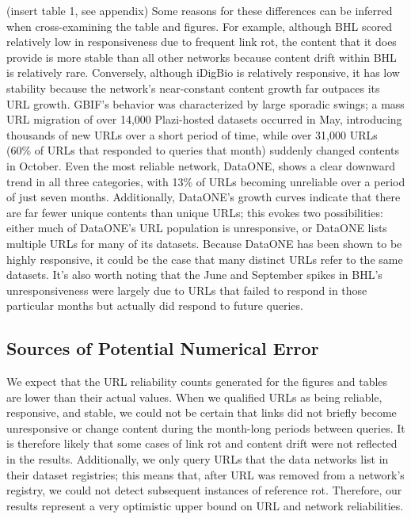 \documentclass[12pt,letterpaper]{article}
\begin{document}
% 
(insert table 1, see appendix)
Some reasons for these differences can be inferred when cross-examining the table and figures. For example, although BHL scored relatively low in responsiveness due to frequent link rot, the content that it does provide is more stable than all other networks because content drift within BHL is relatively rare. Conversely, although iDigBio is relatively responsive, it has low stability because the network’s near-constant content growth far outpaces its URL growth. GBIF’s behavior was characterized by large sporadic swings; a mass URL migration of over 14,000 Plazi-hosted datasets occurred in May, introducing thousands of new URLs over a short period of time, while over 31,000 URLs (60\% of URLs that responded to queries that month) suddenly changed contents in October. Even the most reliable network, DataONE, shows a clear downward trend in all three categories, with 13\% of URLs becoming unreliable over a period of just seven months. Additionally, DataONE’s growth curves indicate that there are far fewer unique contents than unique URLs; this evokes two possibilities: either much of DataONE’s URL population is unresponsive, or DataONE lists multiple URLs for many of its datasets. Because DataONE has been shown to be highly responsive, it could be the case that many distinct URLs refer to the same datasets. It’s also worth noting that the June and September spikes in BHL’s unresponsiveness were largely due to URLs that failed to respond in those particular months but actually did respond to future queries.

\subsection*{Sources of Potential Numerical Error}
We expect that the URL reliability counts generated for the figures and tables are lower than their actual values. When we qualified URLs as being reliable, responsive, and stable, we could not be certain that links did not briefly become unresponsive or change content during the month-long periods between queries. It is therefore likely that some cases of link rot and content drift were not reflected in the results. Additionally, we only query URLs that the data networks list in their dataset registries; this means that, after URL was removed from a network’s registry, we could not detect subsequent instances of reference rot. Therefore, our results represent a very optimistic upper bound on URL and network reliabilities.
\end{document}
